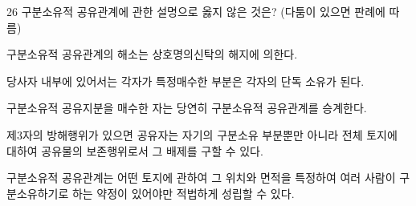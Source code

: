 \begin{question}{26}
구분소유적 공유관계에 관한 설명으로 옳지 않은 것은? (다툼이 있으면 판례에 따름)
\begin{choices}
  \item 구분소유적 공유관계의 해소는 상호명의신탁의 해지에 의한다.
  \item 당사자 내부에 있어서는 각자가 특정매수한 부분은 각자의 단독 소유가 된다.
  \item 구분소유적 공유지분을 매수한 자는 당연히 구분소유적 공유관계를 승계한다.
  \item 제3자의 방해행위가 있으면 공유자는 자기의 구분소유 부분뿐만 아니라 전체 토지에 대하여 공유물의 보존행위로서 그 배제를 구할 수 있다.
  \item 구분소유적 공유관계는 어떤 토지에 관하여 그 위치와 면적을 특정하여 여러 사람이 구분소유하기로 하는 약정이 있어야만 적법하게 성립할 수 있다.
\end{choices}
\end{question}
